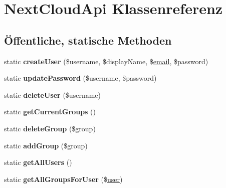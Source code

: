 \hypertarget{class_next_cloud_api}{}\section{Next\+Cloud\+Api Klassenreferenz}
\label{class_next_cloud_api}
\subsection*{Öffentliche, statische Methoden}
\begin{DoxyCompactItemize}
\item 
\mbox{\label{class_next_cloud_api_ad1fea3fa252ab9dfa87524cfeab62e4d}} 
static {\bfseries create\+User} (\$username, \$display\+Name, \$\mbox{\hyperlink{classemail}{email}}, \$password)
\item 
\mbox{\label{class_next_cloud_api_a9ab2a620644a30665ab20cd3dbac2793}} 
static {\bfseries update\+Password} (\$username, \$password)
\item 
\mbox{\label{class_next_cloud_api_a8b0456ead3c11039ba60e9eb8cd576d1}} 
static {\bfseries delete\+User} (\$username)
\item 
\mbox{\label{class_next_cloud_api_ae2e7dca5198c9e3981f282ad0db8cfe5}} 
static {\bfseries get\+Current\+Groups} ()
\item 
\mbox{\label{class_next_cloud_api_aa1968c240be735cce0fa71b2033b7640}} 
static {\bfseries delete\+Group} (\$group)
\item 
\mbox{\label{class_next_cloud_api_a28dd0b82b5732a715e863bc13278615d}} 
static {\bfseries add\+Group} (\$group)
\item 
\mbox{\label{class_next_cloud_api_a91a7c5b435d061dca0a03bb22ad9fa4e}} 
static {\bfseries get\+All\+Users} ()
\item 
\mbox{\label{class_next_cloud_api_a37ecd6b034fe6677e2ddffce0ca590e9}} 
static {\bfseries get\+All\+Groups\+For\+User} (\$\mbox{\hyperlink{classuser}{user}})
\item 
\mbox{\label{class_next_cloud_api_a9fd66bf509bb871f8ce002bb91a58da0}} 

\end{DoxyCompactItemize}
